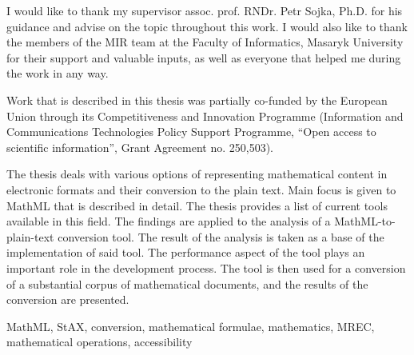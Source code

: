 \documentclass[11pt,oneside,final]{fithesis2}
\def\s#1{#1\index{#1}}
\begin{document}
\sloppy




\FrontMatter
\ThesisTitlePage

\begin{ThesisDeclaration}
\DeclarationText
\AdvisorName
\end{ThesisDeclaration}

\begin{ThesisThanks}
I would like to thank my supervisor assoc. prof. RNDr. \s{Petr Sojka}, Ph.D. for his guidance and advise on the topic throughout this work. I would also like to thank the members of the MIR team at the Faculty of Informatics, Masaryk University for their support and valuable inputs, as well as everyone that helped me during the work in any way. 

Work that is described in this thesis was partially co-funded by the European Union 
through its Competitiveness and Innovation Programme (Information and Communications Technologies Policy Support Programme, ``Open access to scientific information'', Grant Agreement no. 250,503).
\end{ThesisThanks}

\begin{ThesisAbstract}
The thesis deals with various options of representing mathematical content in electronic formats and their conversion to the plain text. Main focus is given to \s{MathML} that is described in detail. The thesis provides a list of current tools available in this field. The findings are applied to the analysis of a MathML-to-plain-text conversion tool. The result of the analysis is taken as a base of the implementation of said tool. The performance aspect of the tool plays an important role in the development process. The tool is then used for a conversion of a substantial corpus of mathematical documents, and the results of the conversion are presented.  
\end{ThesisAbstract}

\begin{ThesisKeyWords}
MathML, StAX, conversion, mathematical formulae, mathematics, MREC, mathematical operations, accessibility
\end{ThesisKeyWords}

\MainMatter
\tableofcontents
\end{document}
